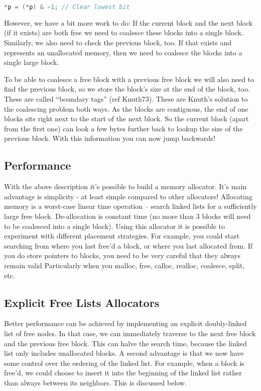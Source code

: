 \begin{lstlisting}[language=C]
*p = (*p) & ~1; // Clear lowest bit 
\end{lstlisting}

However, we have a bit more work to do: If the current block and the next block (if it exists) are both free we need to coalesce these blocks into a single block.
Similarly, we also need to check the previous block, too.
If that exists and represents an unallocated memory, then we need to coalesce the blocks into a single large block.

To be able to coalesce a free block with a previous free block we will also need to find the previous block, so we store the block's size at the end of the block, too.
These are called ``boundary tags'' (ref Knuth73).
These are Knuth's solution to the coalescing problem both ways.
As the blocks are contiguous, the end of one blocks sits right next to the start of the next block.
So the current block (apart from the first one) can look a few bytes further back to lookup the size of the previous block.
With this information you can now jump backwards!

\subsection{Performance}

With the above description it's possible to build a memory allocator. It's main advantage is simplicity - at least simple compared to other allocators!
Allocating memory is a worst-case linear time operation -- search linked lists for a sufficiently large free block.
De-allocation is constant time (no more than 3 blocks will need to be coalesced into a single block).
Using this allocator it is possible to experiment with different placement strategies.
For example, you could start searching from where you last free'd a block, or where you last allocated from.
If you do store pointers to blocks, you need to be very careful that they always remain valid 
Particularly when you malloc, free, calloc, realloc, coalesce, split, etc.

\subsection{Explicit Free Lists Allocators}

Better performance can be achieved by implementing an explicit doubly-linked list of free nodes.
In that case, we can immediately traverse to the next free block and the previous free block.
This can halve the search time, because the linked list only includes unallocated blocks.
A second advantage is that we now have some control over the ordering of the linked list.
For example, when a block is free'd, we could choose to insert it into the beginning of the linked list rather than always between its neighbors.
This is discussed below.

